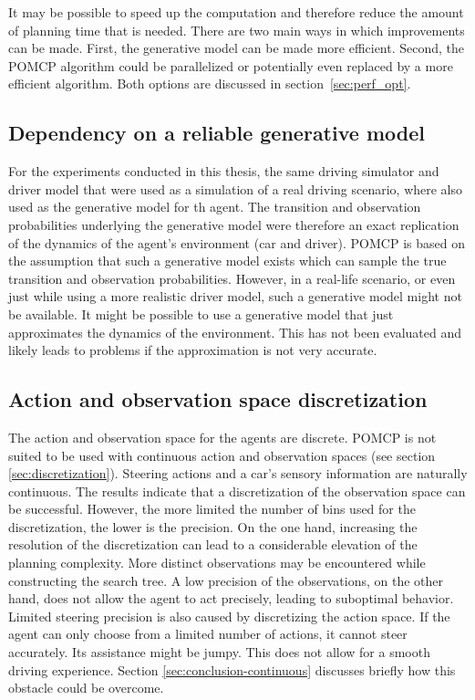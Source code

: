 It may be possible to speed up the computation and therefore reduce the amount of planning time that is needed. There are two main ways in which improvements can be made. First, the generative model can be made more efficient. Second, the POMCP algorithm could be parallelized or potentially even replaced by a more efficient algorithm. Both options are discussed in section~\ref{sec:perf_opt}. 

\subsection{Dependency on a reliable generative model}

For the experiments conducted in this thesis, the same driving simulator and driver model that were used as a simulation of a real driving scenario, where also used as the generative model for th agent. The transition and observation probabilities underlying the generative model were therefore an exact replication of the dynamics of the agent's environment (car and driver). POMCP is based on the assumption that such a generative model exists which can sample the true transition and observation probabilities. However, in a real-life scenario, or even just while using a more realistic driver model, such a generative model might not be available. It might be possible to use a generative model that just approximates the dynamics of the environment. This has not been evaluated and likely leads to problems if the approximation is not very accurate.

\subsection{Action and observation space discretization}

The action and observation space for the agents are discrete. POMCP is not suited to be used with continuous action and observation spaces (see section \ref{sec:discretization}). Steering actions and a car's sensory information are naturally continuous. The results indicate that a discretization of the observation space can be successful. However, the more limited the number of bins used for the discretization, the lower is the precision. On the one hand, increasing the resolution of the discretization can lead to a considerable elevation of the planning complexity. More distinct observations may be encountered while constructing the search tree. A low precision of the observations, on the other hand, does not allow the agent to act precisely, leading to suboptimal behavior. Limited steering precision is also caused by discretizing the action space. If the agent can only choose from a limited number of actions, it cannot steer accurately. Its assistance might be jumpy. This does not allow for a smooth driving experience. Section \ref{sec:conclusion-continuous} discusses briefly how this obstacle could be overcome. 

